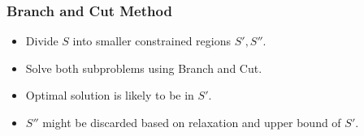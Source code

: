 \documentclass[11pt]{beamer}
\begin{document}
\begin{frame}
	\frametitle{Branch and Cut Method}
	\begin{itemize}
		\item Divide $S$ into smaller constrained regions $S', S''$.
		\item Solve both subproblems using Branch and Cut.
		\item Optimal solution is likely to be in $S'$. 
		\item $S''$ might be discarded based on relaxation and upper bound of $S'$.
	\end{itemize}
\end{frame}
\end{document}
